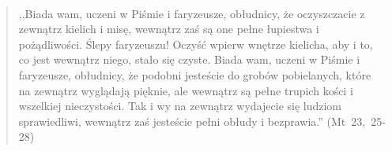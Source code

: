 \documentclass[10pt,a4paper,oneside]{article}
\begin{document}
\paragraph{}
\begin{quote}
,,Biada wam, uczeni w Piśmie i faryzeusze, obłudnicy, że oczyszczacie z zewnątrz kielich i misę, wewnątrz zaś są one pełne łupiestwa i pożądliwości. Ślepy faryzeuszu! Oczyść wpierw wnętrze kielicha, aby i to, co jest wewnątrz niego, stało się czyste. Biada wam, uczeni w Piśmie i faryzeusze, obłudnicy, że podobni jesteście do grobów pobielanych, które na zewnątrz wyglądają pięknie, ale wewnątrz są pełne trupich kości i wszelkiej nieczystości. Tak i wy na zewnątrz wydajecie się ludziom sprawiedliwi, wewnątrz zaś jesteście pełni obłudy i bezprawia.'' \mbox{(Mt 23, 25-28)}
\end{quote}
\end{document}
